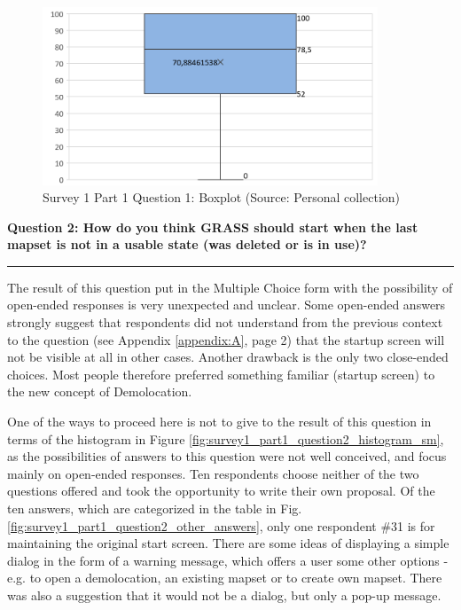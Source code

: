 \documentclass[a4paper,10pt,twoside]{article}
\begin{document}
\vspace{0.3cm}
\begin{figure}[hbt!] 
\begin{center}
\includegraphics[width=10cm]{../surveys/analyzed_data/survey1_part1_question1_excel_boxplot.png} 
\caption[Survey 1 Part 1 Question 1: Boxplot]{Survey 1 Part 1 Question 1: Boxplot (Source: Personal collection)}
\label{fig:survey1_part1_question1_boxplot}
\end{center}
\end{figure}

\newpage
\noindent \textbf{Question 2: How do you think GRASS should start when the last mapset is not in a usable state (was deleted or is in use)?}
\par\noindent\rule{\textwidth}{0.4pt}
\noindent The result of this question put in the Multiple Choice form with the possibility of open-ended responses is very unexpected and unclear. Some open-ended answers strongly suggest that respondents did not understand from the previous context to the question (see Appendix \ref{appendix:A}, page 2) that the startup screen will not be visible at all in other cases. Another drawback is the only two close-ended choices. Most people therefore preferred something familiar (startup screen) to the new concept of Demolocation.

One of the ways to proceed here is not to give to the result of this question in terms of the histogram in Figure \ref{fig:survey1_part1_question2_histogram_sm}, as the possibilities of answers to this question were not well conceived, and focus mainly on open-ended responses. Ten respondents choose neither of the two questions offered and took the opportunity to write their own proposal. Of the ten answers, which are categorized in the table in Fig. \ref{fig:survey1_part1_question2_other_answers}, only one respondent \#31 is for maintaining the original start screen. There are some ideas of displaying a simple dialog in the form of a warning message, which offers a user some other options - e.g. to open a demolocation, an existing mapset or to create own mapset. There was also a suggestion that it would not be a dialog, but only a pop-up message.
\end{document}
